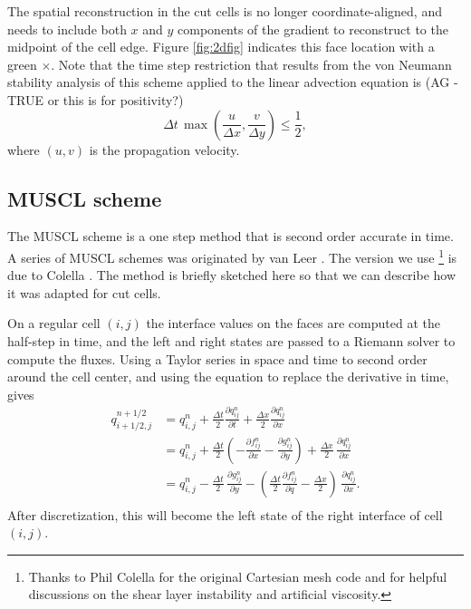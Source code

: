 The spatial reconstruction in the cut cells is no longer
coordinate-aligned, and needs 
to include both $x$ and $y$ components of the gradient to 
reconstruct to the midpoint of the cell edge. 
Figure \ref{fig:2dfig}  indicates this face location with a green $\times$.
Note that the time step restriction that results from the von Neumann 
stability analysis of this scheme applied to the linear advection equation is  (AG -
TRUE or this is for positivity?)
\begin{equation}
\Delta t \,  \max\left(\frac{u}{\Delta x},\frac{v}{\Delta y}\right) \leq \frac{1}{2} ,
\end{equation}
where $(u,v)$ is the propagation velocity.  

\subsection{MUSCL scheme}
The MUSCL scheme is a one step method that is second order accurate in
time. A series of MUSCL schemes  was originated by van Leer 
\cite{vanleer:muscl}. The version we use
\footnote{Thanks to Phil 
Colella for the original Cartesian mesh code and for helpful discussions on the shear
layer instability and artificial viscosity.}
is due to Colella \cite{Colella:Unsplit}.
The method is briefly sketched here so that we can describe how it was
adapted for cut cells. 

On a regular cell $(i,j)$ the interface values on the 
faces are computed at the half-step in time, and the left and right states
are passed to a Riemann
solver to compute the fluxes.
Using a Taylor series in space and time to second order around the
cell center, and using the equation to replace the derivative in time,  gives
\begin{equation}\label{taylor}
\begin{split}
q_{i+1/2,j}^{n+1/2} & = q_{i,j}^n + 
              \frac{\Delta t}{2} \frac{\partial q_{ij}^n}{\partial t} + 
              \frac{\Delta x}{2} \frac{\partial q_{ij}^n}{\partial x} \\[.08in]
            &  = q_{i,j}^n + \frac{\Delta t}{2} 
            (-\frac{\partial f_{ij}^n}{\partial x} -
             \frac{\partial g_{ij}^n}{\partial y})  +
             \frac{\Delta x}{2} \, \frac{\partial q_{ij}^n}{\partial x} \\[.08in]
            &  = q_{i,j}^n - \frac{\Delta t}{2} \, 
             \frac{\partial g_{ij}^n}{\partial y}  -
            ( \frac{\Delta t}{2} 
            \frac{\partial f_{ij}^n}{\partial q} -
             \frac{\Delta x}{2} ) \,\frac{\partial q_{ij}^n}{\partial x} . \\[.08in]
\end{split}
\end{equation}
After discretization, this will become the left state of the right interface
of cell $(i,j)$.

